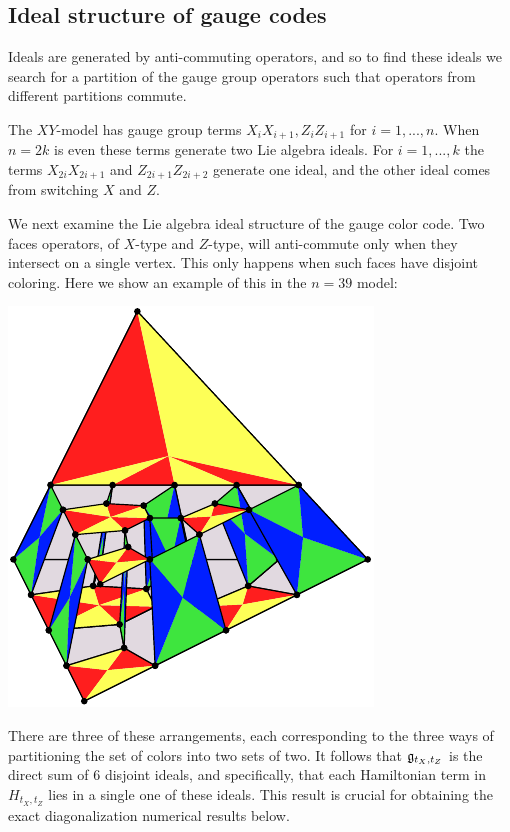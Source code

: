 
\subsection{Ideal structure of gauge codes}

Ideals are generated by anti-commuting operators,
and so to find these ideals we search for a partition of
the gauge group operators such that operators from
different partitions commute.

The $XY$-model has gauge group
terms $X_i X_{i+1}, Z_i Z_{i+1}$ for $i=1,...,n.$
When $n=2k$ is even 
these terms generate two Lie algebra ideals.
For $i=1,...,k$
the terms $X_{2i}X_{2i+1}$ and $Z_{2i+1}Z_{2i+2}$ 
generate one ideal, and the other ideal comes from switching $X$ and $Z.$

We next examine the Lie algebra ideal structure of the gauge color code.
Two faces operators, of $X$-type and $Z$-type,
will anti-commute only when
they intersect on a single vertex.
This only happens when such faces have disjoint coloring.
Here we show an example of this in the $n=39$ model:
\begin{center}
\includegraphics{pic-gcolor-ideal.pdf}
\end{center}
There are three of these arrangements,
each corresponding to the three ways of
partitioning the set of colors into two sets of two.
It follows that $\mathfrak{g}_{t_X,t_Z}$ 
is the direct sum of 6 disjoint ideals,
and specifically, that each Hamiltonian term in $H_{t_X,t_Z}$
lies in a single one of these ideals.
This result is crucial for obtaining the exact
diagonalization numerical results below.

